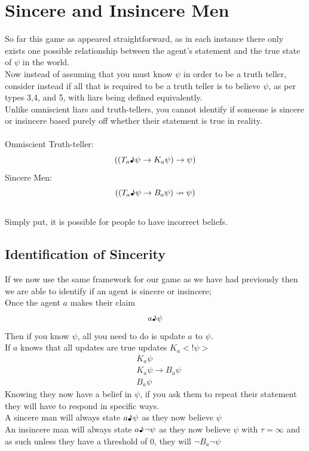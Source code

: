 \documentclass[12pt, titlepage, twoside, a4paper]{report}
\begin{document}
\section{Sincere and Insincere Men}
So far this game as appeared straightforward, as in each instance there only exists one possible relationship between the agent's statement and the true state of $\psi$ in the world.\\
Now instead of assuming that you must know $\psi$ in order to be a truth teller, consider instead if all that is required to be a truth teller is to believe $\psi$, as per types 3,4, and 5, with liars being defined equivalently.\\
Unlike omniscient liars and truth-tellers, you cannot identify if someone is sincere or insincere based purely off whether their statement is true in reality.\\
\\
Omniscient Truth-teller:
$$((T_a \text{\textmusicalnote} \psi \to K_a \psi)\to \psi)$$
Sincere Men:
$$((T_a \text{\textmusicalnote} \psi \to B_a \psi)\nrightarrow \psi)$$ \\
Simply put, it is possible for people to have incorrect beliefs.

\subsection{Identification of Sincerity}
If we now use the same framework for our game as we have had previously then we are able to identify if an agent is sincere or insincere;\\
Once the agent $a$ makes their claim 
$$a\text{\textmusicalnote} \psi$$
Then if you know $\psi$, all you need to do is update $a$ to $\psi$.\\
If $a$ knows that all updates are true updates $K_a<!\psi >$
\begin{align*}
&K_a \psi\\
&K_a \psi \to B_a \psi\\
&B_a \psi
\end{align*}
Knowing they now have a belief in $\psi$, if you ask them to repeat their statement they will have to respond in specific ways.\\
A sincere man will always state $a \text{\textmusicalnote} \psi$ as they now believe $\psi$\\
An insincere man will always state $a \text{\textmusicalnote} \neg \psi$ as they now believe $\psi$ with $\tau = \infty$ and as such unless they have a threshold of $0$, they will $\neg B_a \neg \psi$
\end{document}
